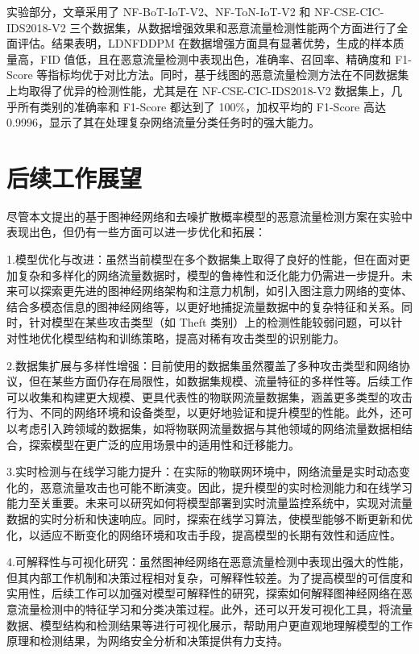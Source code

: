 \documentclass[promaster]{thesis-uestc}
\begin{document}
实验部分，文章采用了 NF-BoT-IoT-V2、NF-ToN-IoT-V2 和 NF-CSE-CIC-IDS2018-V2 三个数据集，从数据增强效果和恶意流量检测性能两个方面进行了全面评估。结果表明，LDNFDDPM 在数据增强方面具有显著优势，生成的样本质量高，FID 值低，且在恶意流量检测中表现出色，准确率、召回率、精确度和 F1-Score 等指标均优于对比方法。同时，基于线图的恶意流量检测方法在不同数据集上均取得了优异的检测性能，尤其是在 NF-CSE-CIC-IDS2018-V2 数据集上，几乎所有类别的准确率和 F1-Score 都达到了 100\%，加权平均的 F1-Score 高达 0.9996，显示了其在处理复杂网络流量分类任务时的强大能力。

\section{后续工作展望}

尽管本文提出的基于图神经网络和去噪扩散概率模型的恶意流量检测方案在实验中表现出色，但仍有一些方面可以进一步优化和拓展：

1.模型优化与改进：虽然当前模型在多个数据集上取得了良好的性能，但在面对更加复杂和多样化的网络流量数据时，模型的鲁棒性和泛化能力仍需进一步提升。未来可以探索更先进的图神经网络架构和注意力机制，如引入图注意力网络的变体、结合多模态信息的图神经网络等，以更好地捕捉流量数据中的复杂特征和关系。同时，针对模型在某些攻击类型（如 Theft 类别）上的检测性能较弱问题，可以针对性地优化模型结构和训练策略，提高对稀有攻击类型的识别能力。

2.数据集扩展与多样性增强：目前使用的数据集虽然覆盖了多种攻击类型和网络协议，但在某些方面仍存在局限性，如数据集规模、流量特征的多样性等。后续工作可以收集和构建更大规模、更具代表性的物联网流量数据集，涵盖更多类型的攻击行为、不同的网络环境和设备类型，以更好地验证和提升模型的性能。此外，还可以考虑引入跨领域的数据集，如将物联网流量数据与其他领域的网络流量数据相结合，探索模型在更广泛的应用场景中的适用性和迁移能力。

3.实时检测与在线学习能力提升：在实际的物联网环境中，网络流量是实时动态变化的，恶意流量攻击也可能不断演变。因此，提升模型的实时检测能力和在线学习能力至关重要。未来可以研究如何将模型部署到实时流量监控系统中，实现对流量数据的实时分析和快速响应。同时，探索在线学习算法，使模型能够不断更新和优化，以适应不断变化的网络环境和攻击手段，提高模型的长期有效性和适应性。

4.可解释性与可视化研究：虽然图神经网络在恶意流量检测中表现出强大的性能，但其内部工作机制和决策过程相对复杂，可解释性较差。为了提高模型的可信度和实用性，后续工作可以加强对模型可解释性的研究，探索如何解释图神经网络在恶意流量检测中的特征学习和分类决策过程。此外，还可以开发可视化工具，将流量数据、模型结构和检测结果等进行可视化展示，帮助用户更直观地理解模型的工作原理和检测结果，为网络安全分析和决策提供有力支持。
\end{document}
